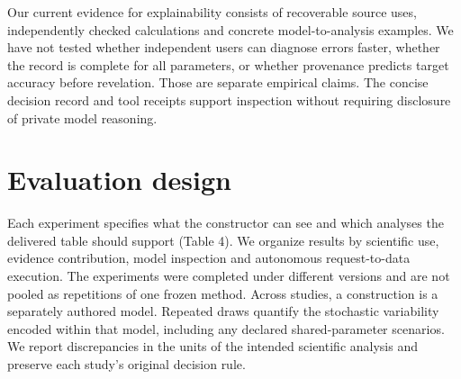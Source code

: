\documentclass[11pt,letterpaper]{article}
\begin{document}
Our current evidence for explainability consists of recoverable source uses, independently checked calculations and concrete model-to-analysis examples. We have not tested whether independent users can diagnose errors faster, whether the record is complete for all parameters, or whether provenance predicts target accuracy before revelation. Those are separate empirical claims. The concise decision record and tool receipts support inspection without requiring disclosure of private model reasoning.



\section{Evaluation design}

Each experiment specifies what the constructor can see and which analyses the delivered table should support (Table 4). We organize results by scientific use, evidence contribution, model inspection and autonomous request-to-data execution. The experiments were completed under different versions and are not pooled as repetitions of one frozen method. Across studies, a construction is a separately authored model. Repeated draws quantify the stochastic variability encoded within that model, including any declared shared-parameter scenarios. We report discrepancies in the units of the intended scientific analysis and preserve each study's original decision rule.


\FloatBarrier

\begingroup

\small

\renewcommand{\arraystretch}{1.22}
\end{document}
